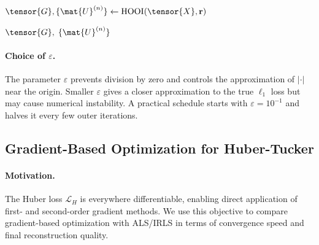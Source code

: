 \begin{algorithm}[t]
  \caption{IRLS for $\ell_1$-Tucker decomposition}
  \label{alg:irls}

  \BlankLine
  $\tensor{G}, \{\mat{U}^{(n)}\} \leftarrow \mathrm{HOOI}(\tensor{X},
    \mathbf{r})$

  \Return $\tensor{G},\; \{\mat{U}^{(n)}\}$\;
\end{algorithm}

\paragraph{Choice of $\varepsilon$.}
The parameter $\varepsilon$ prevents division by zero and controls the
approximation of $|\cdot|$ near the origin.
Smaller $\varepsilon$ gives a closer approximation to the true $\ell_1$
loss but may cause numerical instability.
A practical schedule starts with $\varepsilon = 10^{-1}$ and halves it
every few outer iterations.

\subsection{Gradient-Based Optimization for Huber-Tucker}
\label{subsec:gradient}

\paragraph{Motivation.}
The Huber loss $\mathcal{L}_H$ is everywhere differentiable, enabling
direct application of first- and second-order gradient methods.
We use this objective to compare gradient-based optimization with
ALS/IRLS in terms of convergence speed and final reconstruction quality.

